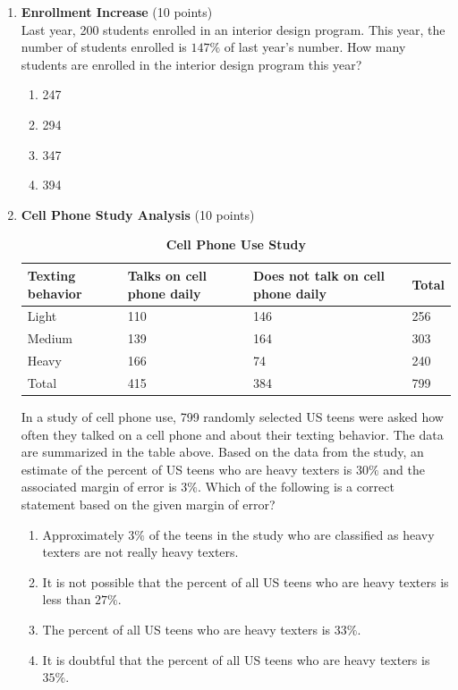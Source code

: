 \begin{enumerate}
  \item \textbf{Enrollment Increase} (10 points)\\
  Last year, 200 students enrolled in an interior design program. This year, the number of students enrolled is $147\%$ of last year's number. How many students are enrolled in the interior design program this year?
  \begin{enumerate}[label=(\Alph*)]
    \item 247
    \item 294
    \item 347
    \item 394
  \end{enumerate}
  \begin{subanswer}
  \end{subanswer}

  \newpage

  \item \textbf{Cell Phone Study Analysis} (10 points)\\
  \begin{table}[h!]
  \centering
  \renewcommand{\arraystretch}{1.3}
  \setlength{\tabcolsep}{8pt}
  \caption*{\textbf{Cell Phone Use Study}}
  \begin{tabular}{|l|l|l|l|}
  \hline
  \rowcolor[HTML]{E0E0E0}
  \textbf{Texting behavior} & \textbf{Talks on cell phone daily} & \textbf{Does not talk on cell phone daily} & \textbf{Total} \\
  \hline
  Light & 110 & 146 & 256 \\
  \hline
  Medium & 139 & 164 & 303 \\
  \hline
  Heavy & 166 & 74 & 240 \\
  \hline
  Total & 415 & 384 & 799 \\
  \hline
  \end{tabular}
  \end{table}
  In a study of cell phone use, 799 randomly selected US teens were asked how often they talked on a cell phone and about their texting behavior. The data are summarized in the table above. Based on the data from the study, an estimate of the percent of US teens who are heavy texters is $30\%$ and the associated margin of error is $3\%$. Which of the following is a correct statement based on the given margin of error?
  \begin{enumerate}[label=(\Alph*)]
    \item Approximately $3\%$ of the teens in the study who are classified as heavy texters are not really heavy texters.
    \item It is not possible that the percent of all US teens who are heavy texters is less than $27\%$.
    \item The percent of all US teens who are heavy texters is $33\%$.
    \item It is doubtful that the percent of all US teens who are heavy texters is $35\%$.
  \end{enumerate}
  \begin{subanswer}
  \end{subanswer}


\end{enumerate}
